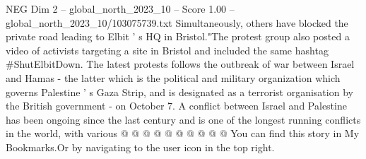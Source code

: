 \begin{textsample}{NEG Dim 2 – global\_north\_2023\_10 – Score 1.00 – global\_north\_2023\_10/103075739.txt}
Simultaneously, others have blocked the private road leading to Elbit ' s HQ in Bristol."The protest group also posted a video of activists targeting a site in Bristol and included the same hashtag \#ShutElbitDown.
The latest protests follows the outbreak of war between Israel and Hamas - the latter which is the political and military organization which governs Palestine ' s Gaza Strip, and is designated as a terrorist organisation by the British government - on October 7.
A conflict between Israel and Palestine has been ongoing since the last century and is one of the longest running conflicts in the world, with various @ @ @ @ @ @ @ @ @ @ You can find this story in My Bookmarks.Or by navigating to the user icon in the top right.

\end{textsample}
